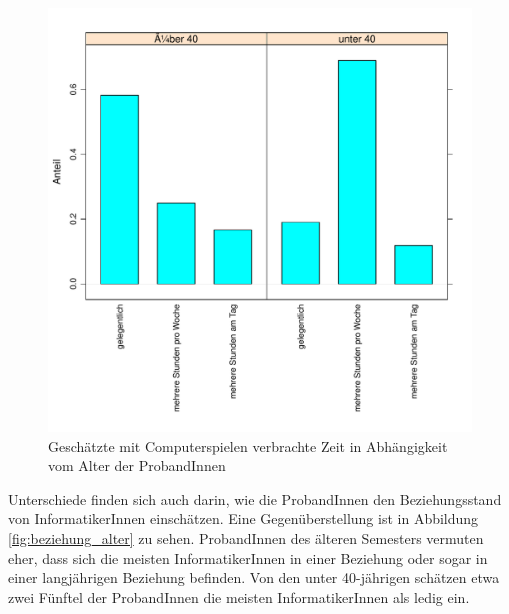 \documentclass[de]{agse-empir-report}\usepackage[]{graphicx}\usepackage[]{color}
\newenvironment{knitrout}{}{} %
\begin{document}
\begin{figure}
\begin{knitrout}
\color{fgcolor}
\includegraphics[width=\linewidth]{figure/chart_age-games-1} 

\end{knitrout}
    \caption{Gesch\"atzte mit Computerspielen verbrachte Zeit in Abh\"angigkeit vom Alter der ProbandInnen}
    \label{fig:games_alter}
\end{figure}

Unterschiede finden sich auch darin, wie die ProbandInnen den Beziehungsstand von InformatikerInnen einschätzen. Eine Gegen\"uberstellung ist in Abbildung \ref{fig:beziehung_alter} zu sehen. ProbandInnen des \"alteren Semesters vermuten eher, dass sich die meisten InformatikerInnen in einer Beziehung oder sogar in einer langj\"ahrigen Beziehung befinden. Von den unter 40-j\"ahrigen sch\"atzen etwa zwei F\"unftel der ProbandInnen die meisten InformatikerInnen als ledig ein.
\end{document}
